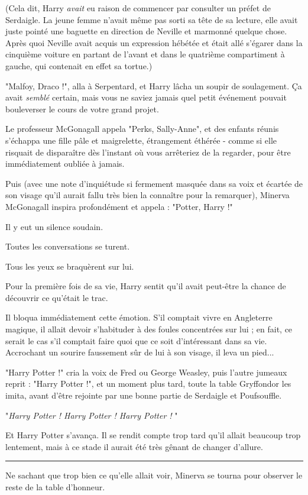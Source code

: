 (Cela dit, Harry \emph{avait } eu raison de commencer par consulter un préfet de Serdaigle. La jeune femme n'avait même pas sorti sa tête de sa lecture, elle avait juste pointé une baguette en direction de Neville et marmonné quelque chose. Après quoi Neville avait acquis un expression hébétée et était allé s'égarer dans la cinquième voiture en partant de l'avant et dans le quatrième compartiment à gauche, qui contenait en effet sa tortue.)

"Malfoy, Draco !", alla à Serpentard, et Harry lâcha un soupir de soulagement. Ça avait \emph{semblé}  certain, mais vous ne saviez jamais quel petit événement pouvait bouleverser le cours de votre grand projet.

Le professeur McGonagall appela "Perks, Sally-Anne", et des enfants réunis s'échappa une fille pâle et maigrelette, étrangement éthérée - comme si elle risquait de disparaître dès l'instant où vous arrêteriez de la regarder, pour être immédiatement oubliée à jamais.

Puis (avec une note d'inquiétude si fermement masquée dans sa voix et écartée de son visage qu'il aurait fallu très bien la connaître pour la remarquer), Minerva McGonagall inspira profondément et appela : "Potter, Harry !"

Il y eut un silence soudain.

Toutes les conversations se turent.

Tous les yeux se braquèrent sur lui.

Pour la première fois de sa vie, Harry sentit qu'il avait peut-être la chance de découvrir ce qu'était le trac.

Il bloqua immédiatement cette émotion. S'il comptait vivre en Angleterre magique, il allait devoir s'habituder à des foules concentrées sur lui ; en fait, ce serait le cas s'il comptait faire quoi que ce soit d'intéressant dans sa vie. Accrochant un sourire faussement sûr de lui à son visage, il leva un pied...

"Harry Potter !" cria la voix de Fred ou George Weasley, puis l'autre jumeaux reprit : "Harry Potter !", et un moment plus tard, toute la table Gryffondor les imita, avant d'être rejointe par une bonne partie de Serdaigle et Poufsouffle.

"\emph{Harry Potter ! Harry Potter ! Harry Potter !} "

Et Harry Potter s'avança. Il se rendit compte trop tard qu'il allait beaucoup trop lentement, mais à ce stade il aurait été très gênant de changer d'allure.
\par\noindent\rule{\textwidth}{0.4pt}
Ne sachant que trop bien ce qu'elle allait voir, Minerva se tourna pour observer le reste de la table d'honneur.

